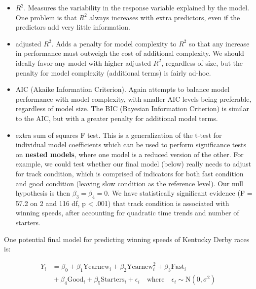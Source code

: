 \documentclass[
]{krantz}
\providecommand{\tightlist}{%
  \setlength{\itemsep}{0pt}\setlength{\parskip}{0pt}}
\begin{document}
\begin{itemize}
\tightlist
\item
  \(R^2\).  Measures the variability in the response variable explained by the model. One problem is that \(R^2\) always increases with extra predictors, even if the predictors add very little information.
\item
  adjusted \(R^2\).  Adds a penalty for model complexity to \(R^2\) so that any increase in performance must outweigh the cost of additional complexity. We should ideally favor any model with higher adjusted \(R^2\), regardless of size, but the penalty for model complexity (additional terms) is fairly ad-hoc.
\item
  AIC (Akaike Information Criterion).  Again attempts to balance model performance with model complexity, with smaller AIC levels being preferable, regardless of model size. The BIC (Bayesian Information Criterion)  is similar to the AIC, but with a greater penalty for additional model terms.
\item
  extra sum of squares F test. This is a generalization of the t-test for individual model coefficients which can be used to perform significance tests on \textbf{nested models},  where one model is a reduced version of the other. For example, we could test whether our final model (below) really needs to adjust for track condition, which is comprised of indicators for both fast condition and good condition (leaving slow condition as the reference level). Our null hypothesis is then \(\beta_{3}=\beta_{4}=0\). We have statistically significant evidence (F = 57.2 on 2 and 116 df, p \textless{} .001) that track condition is associated with winning speeds, after accounting for quadratic time trends and number of starters.
\end{itemize}

One potential final model for predicting winning speeds of Kentucky Derby races is:

\begin{equation}
\begin{split}
 Y_{i}&=\beta_{0}+\beta_{1}\textrm{Yearnew}_{i}+\beta_{2}\textrm{Yearnew}^2_{i}+\beta_{3}\textrm{Fast}_{i}\\
      &{}+\beta_{4}\textrm{Good}_{i}+\beta_{5}\textrm{Starters}_{i}+\epsilon_{i}\quad 
      \textrm{where}\quad \epsilon_{i}\sim \textrm{N}(0,\sigma^2)
\end{split}
\label{eq:model0}
\end{equation}
\end{document}
